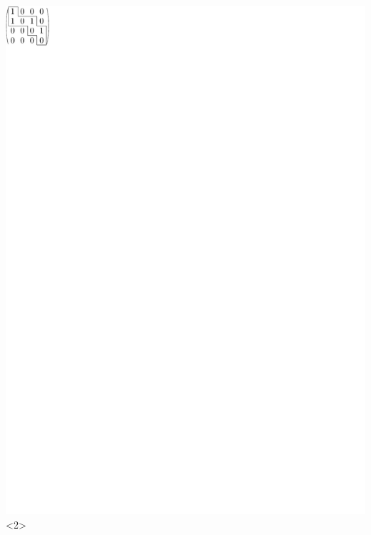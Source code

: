 \documentclass{beamer}
\begin{document}
\begin{frame}
\includegraphics{../img/walkingexample2.pdf}<2>

\end{frame}
\end{document}
